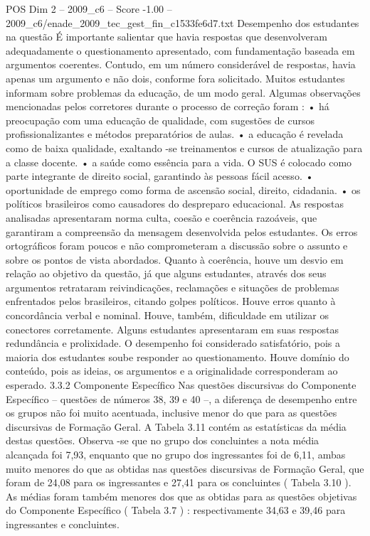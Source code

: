 \begin{textsample}{POS Dim 2 – 2009\_c6 – Score -1.00 – 2009\_c6/enade\_2009\_tec\_gest\_fin\_c1533fe6d7.txt}
Desempenho dos estudantes na questão É importante salientar que havia respostas que desenvolveram adequadamente o questionamento apresentado, com fundamentação baseada em argumentos coerentes.
Contudo, em um número considerável de respostas, havia apenas um argumento e não dois, conforme fora solicitado.
Muitos estudantes informam sobre problemas da educação, de um modo geral.
Algumas observações mencionadas pelos corretores durante o processo de correção foram : • há preocupação com uma educação de qualidade, com sugestões de cursos profissionalizantes e métodos preparatórios de aulas. • a educação é revelada como de baixa qualidade, exaltando -se treinamentos e cursos de atualização para a classe docente. • a saúde como essência para a vida.
O SUS é colocado como parte integrante de direito social, garantindo às pessoas fácil acesso. • oportunidade de emprego como forma de ascensão social, direito, cidadania. • os políticos brasileiros como causadores do despreparo educacional.
As respostas analisadas apresentaram norma culta, coesão e coerência razoáveis, que garantiram a compreensão da mensagem desenvolvida pelos estudantes.
Os erros ortográficos foram poucos e não comprometeram a discussão sobre o assunto e sobre os pontos de vista abordados.
Quanto à coerência, houve um desvio em relação ao objetivo da questão, já que alguns estudantes, através dos seus argumentos retrataram reivindicações, reclamações e situações de problemas enfrentados pelos brasileiros, citando golpes políticos.
Houve erros quanto à concordância verbal e nominal.
Houve, também, dificuldade em utilizar os conectores corretamente.
Alguns estudantes apresentaram em suas respostas redundância e prolixidade.
O desempenho foi considerado satisfatório, pois a maioria dos estudantes soube responder ao questionamento.
Houve domínio do conteúdo, pois as ideias, os argumentos e a originalidade corresponderam ao esperado. 3.3.2 Componente Específico Nas questões discursivas do Componente Específico – questões de números 38, 39 e 40 –, a diferença de desempenho entre os grupos não foi muito acentuada, inclusive menor do que para as questões discursivas de Formação Geral.
A Tabela 3.11 contém as estatísticas da média destas questões.
Observa -se que no grupo dos concluintes a nota média alcançada foi 7,93, enquanto que no grupo dos ingressantes foi de 6,11, ambas muito menores do que as obtidas nas questões discursivas de Formação Geral, que foram de 24,08 para os ingressantes e 27,41 para os concluintes ( Tabela 3.10 ).
As médias foram também menores dos que as obtidas para as questões objetivas do Componente Específico ( Tabela 3.7 ) : respectivamente 34,63 e 39,46 para ingressantes e concluintes.

\end{textsample}
